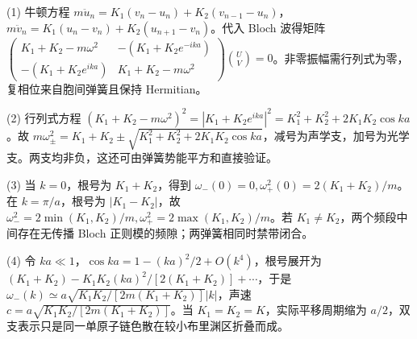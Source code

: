 (1) 牛顿方程 \(m\ddot u_n=K_1(v_n-u_n)+K_2(v_{n-1}-u_n)\)，\(m\ddot v_n=K_1(u_n-v_n)+K_2(u_{n+1}-v_n)\)。代入 Bloch 波得矩阵 \(\begin{pmatrix}K_1+K_2-m\omega^2&-(K_1+K_2e^{-ika})\\-(K_1+K_2e^{ika})&K_1+K_2-m\omega^2\end{pmatrix}\binom UV=0\)。非零振幅需行列式为零，复相位来自胞间弹簧且保持 Hermitian。

(2) 行列式方程 \((K_1+K_2-m\omega^2)^2=|K_1+K_2e^{ika}|^2=K_1^2+K_2^2+2K_1K_2\cos ka\)。故 \(m\omega_\pm^2=K_1+K_2\pm\sqrt{K_1^2+K_2^2+2K_1K_2\cos ka}\)，减号为声学支，加号为光学支。两支均非负，这还可由弹簧势能平方和直接验证。

(3) 当 \(k=0\)，根号为 \(K_1+K_2\)，得到 \(\omega_-(0)=0,\omega_+^2(0)=2(K_1+K_2)/m\)。在 \(k=\pi/a\)，根号为 \(|K_1-K_2|\)，故 \(\omega_-^2=2\min(K_1,K_2)/m,\omega_+^2=2\max(K_1,K_2)/m\)。若 \(K_1\ne K_2\)，两个频段中间存在无传播 Bloch 正则模的频隙；两弹簧相同时禁带闭合。

(4) 令 \(ka\ll1\)，\(\cos ka=1-(ka)^2/2+O(k^4)\)，根号展开为 \((K_1+K_2)-K_1K_2(ka)^2/[2(K_1+K_2)]+\cdots\)，于是 \(\omega_-(k)\simeq a\sqrt{K_1K_2/[2m(K_1+K_2)]}|k|\)，声速 \(c=a\sqrt{K_1K_2/[2m(K_1+K_2)]}\)。当 \(K_1=K_2=K\)，实际平移周期缩为 \(a/2\)，双支表示只是同一单原子链色散在较小布里渊区折叠而成。
